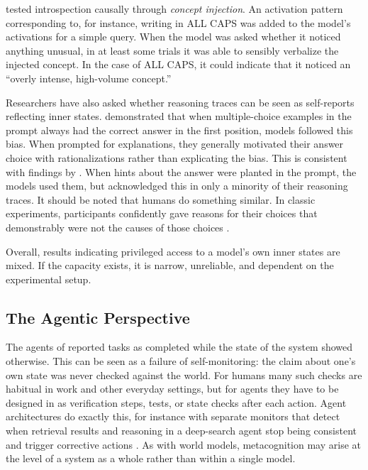 \citet{lindsey2025introspection} tested introspection causally through \emph{concept injection}. An activation pattern corresponding to, for instance, writing in ALL CAPS was added to the model's activations for a simple query. When the model was asked whether it noticed anything unusual, in at least some trials it was able to sensibly verbalize the injected concept. In the case of ALL CAPS, it could indicate that it noticed an ``overly intense, high-volume concept.'' 

Researchers have also asked whether reasoning traces can be seen as self-reports reflecting inner states. \citet{turpin2023language} demonstrated that when multiple-choice examples in the prompt always had the correct answer in the first position, models followed this bias. When prompted for explanations, they generally motivated their answer choice with rationalizations rather than explicating the bias. This is consistent with findings by \citet{chen2025reasoningmodelsdontsay}. When hints about the answer were planted in the prompt, the models used them, but acknowledged this in only a minority of their reasoning traces. It should be noted that humans do something similar. In classic experiments, participants confidently gave reasons for their choices that demonstrably were not the causes of those choices \citep{nisbett1977telling}.

Overall, results indicating privileged access to a model's own inner states are mixed. If the capacity exists, it is narrow, unreliable, and dependent on the experimental setup.

\subsection{The Agentic Perspective}
The agents of \citet{shapira2026agentschaos} reported tasks as completed while the state of the system showed otherwise. This can be seen as a failure of self-monitoring: the claim about one's own state was never checked against the world. For humans many such checks are habitual in work and other everyday settings, but for agents they have to be designed in as verification steps, tests, or state checks after each action. Agent architectures do exactly this, for instance with separate monitors that detect when retrieval results and reasoning in a deep-search agent stop being consistent and trigger corrective actions \citep{sun2026deepsearch}. As with world models, metacognition may arise at the level of a system as a whole rather than within a single model.

